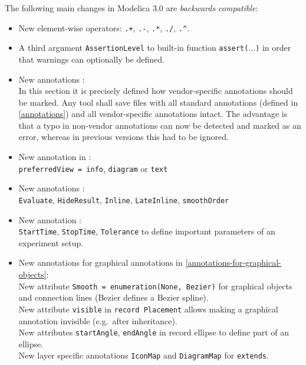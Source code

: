 The following main changes in Modelica 3.0 are \emph{backwards compatible}:
\begin{itemize}
\item
  New element-wise operators: \lstinline!.+!, \lstinline!.-!, \lstinline!.*!, \lstinline!./!, \lstinline!.^!.
\item
  A third argument \lstinline!AssertionLevel! to built-in function \lstinline!assert(!...\lstinline!)! in
  order that warnings can optionally be defined.
\item
  New annotations :\\
  In this section it is precisely defined how vendor-specific
  annotations should be marked. Any tool shall save files with all
  standard annotations (defined in \cref{annotations}) and all vendor-specific
  annotations intact. The advantage is that a typo in non-vendor
  annotations can now be detected and marked as an error, whereas in
  previous versions this had to be ignored.
\item
  New annotation in :\\
  \lstinline!preferredView = info!, \lstinline!diagram! or \lstinline!text!
\item
  New annotations :\\
  \lstinline!Evaluate!, \lstinline!HideResult!, \lstinline!Inline!, \lstinline!LateInline!, \lstinline!smoothOrder!
\item
  New annotation :\\
  \lstinline!StartTime!, \lstinline!StopTime!, \lstinline!Tolerance! to define important parameters of an
  experiment setup.
\item
  New annotations for graphical annotations in \cref{annotations-for-graphical-objects}:\\
  New attribute \lstinline!Smooth = enumeration(None, Bezier)! for graphical objects
  and connection lines (Bezier defines a Bezier spline).\\
  New attribute \lstinline!visible! in \lstinline!record Placement! allows making a graphical
  annotation invisible (e.g.\ after inheritance).\\
  New attributes \lstinline!startAngle!, \lstinline!endAngle! in record ellipse to define part
  of an ellipse.\\
  New layer specific annotations \lstinline!IconMap! and \lstinline!DiagramMap! for \lstinline!extends!.\\

\end{itemize}
